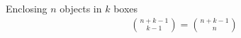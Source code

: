 Enclosing $n$ objects in $k$ boxes
\begin{gather*}
\binom{n + k - 1}{k - 1} = \binom{n + k - 1}{n}
\end{gather*}
\vspace{-15pt}
